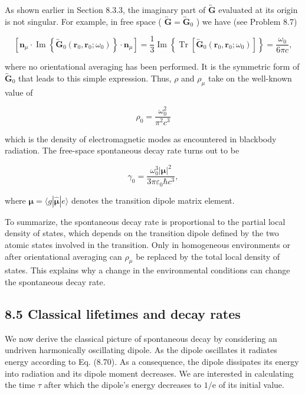\documentclass[10pt]{article}
\begin{document}
As shown earlier in Section 8.3.3, the imaginary part of $\overleftrightarrow{\mathbf{G}}$ evaluated at its origin is not singular. For example, in free space ( $\overleftrightarrow{\mathbf{G}}=\overleftrightarrow{\mathbf{G}}_{0}$ ) we have (see Problem 8.7)


\begin{equation*}
\left[\mathbf{n}_{\mu} \cdot \operatorname{Im}\left\{\overleftrightarrow{\mathbf{G}}_{0}\left(\mathbf{r}_{0}, \mathbf{r}_{0} ; \omega_{0}\right)\right\} \cdot \mathbf{n}_{\mu}\right]=\frac{1}{3} \operatorname{Im}\left\{\operatorname{Tr}\left[\overleftrightarrow{\mathbf{G}}_{0}\left(\mathbf{r}_{0}, \mathbf{r}_{0} ; \omega_{0}\right)\right]\right\}=\frac{\omega_{0}}{6 \pi c}, \tag{8.118}
\end{equation*}


where no orientational averaging has been performed. It is the symmetric form of $\overleftrightarrow{\mathbf{G}}_{0}$ that leads to this simple expression. Thus, $\rho$ and $\rho_{\mu}$ take on the well-known value of


\begin{equation*}
\rho_{0}=\frac{\omega_{0}^{2}}{\pi^{2} c^{3}} \tag{8.119}
\end{equation*}


which is the density of electromagnetic modes as encountered in blackbody radiation. The free-space spontaneous decay rate turns out to be


\begin{equation*}
\gamma_{0}=\frac{\omega_{0}^{3}|\boldsymbol{\mu}|^{2}}{3 \pi \varepsilon_{0} \hbar c^{3}}, \tag{8.120}
\end{equation*}


where $\boldsymbol{\mu}=\langle g| \hat{\boldsymbol{\mu}}|e\rangle$ denotes the transition dipole matrix element.

To summarize, the spontaneous decay rate is proportional to the partial local density of states, which depends on the transition dipole defined by the two atomic states involved in the transition. Only in homogeneous environments or after orientational averaging can $\rho_{\mu}$ be replaced by the total local density of states. This explains why a change in the environmental conditions can change the spontaneous decay rate.

\subsection*{8.5 Classical lifetimes and decay rates}
We now derive the classical picture of spontaneous decay by considering an undriven harmonically oscillating dipole. As the dipole oscillates it radiates energy according to Eq. (8.70). As a consequence, the dipole dissipates its energy into radiation and its dipole moment decreases. We are interested in calculating the time $\tau$ after which the dipole's energy decreases to $1 / \mathrm{e}$ of its initial value.
\end{document}
